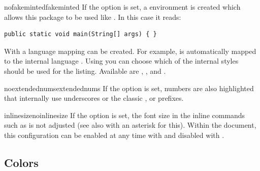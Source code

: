 \documentclass{sopra-base}
\begin{document}
    \begin{argument}{nofakeminted}{fakeminted}
        If the option is set, a  environment is created which allows this package to be used like . In this case it reads:
\begin{plainlatex}
\begin{verbatim}
public static void main(String[] args) { }
\end{verbatim}
\end{plainlatex}
        With  a language mapping can be created. For example,  is automatically mapped to the internal language .
        Using  you can choose which of the internal styles should be used for the listing. Available are , ,  and .
    \end{argument}

    \begin{argument}{noextendednums}{extendednums}
        If the option is set, numbers are also highlighted that internally use underscores or the classic ,  or  prefixes.
    \end{argument}

    \begin{argument}{inlinesize}{noinlinesize}
        If the option is set, the font size in the inline commands such as  is not adjusted (see also  with an asterisk for this). Within the document, this configuration can be enabled at any time with  and disabled with .
    \end{argument}
\subsection{Colors}
\end{document}
